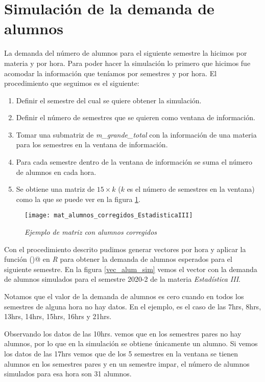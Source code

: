 \section{Simulación de la demanda de alumnos}

La demanda del número de alumnos para el siguiente semestre la hicimos por materia y por hora. Para poder hacer la simulación lo primero que hicimos fue acomodar la información que teníamos por semestres y por hora. El procedimiento que seguimos es el siguiente:

\begin{enumerate}
\item Definir el semestre del cual se quiere obtener la simulación.

\item Definir el número de semestres que se quieren como ventana de información.

\item Tomar una submatriz de \textit{m\_grande\_total} con la información de una materia para los semestres en la ventana de información.

\item Para cada semestre dentro de la ventana de información se suma el número de alumnos en cada hora.

\item Se obtiene una matriz de $15 \times k$ ($k$ es el número de semestres en la ventana) como la que se puede ver en la figura \ref{matAl_corregidos}.
\end{enumerate}

\begin{figure}[H]
\centering
\texttt{[image: mat\_alumnos\_corregidos\_EstadisticaIII]} %
\caption{\textit{Ejemplo de matriz con alumnos corregidos}}\label{matAl_corregidos}
\end{figure}

Con el procedimiento descrito pudimos generar vectores por hora y aplicar la función \verb@hw()@ en \textit{R} para obtener la demanda de alumnos esperados para el siguiente semestre. En la figura \ref{vec_alum_sim} vemos el vector con la demanda de alumnos simulados para el semestre 2020-2 de la materia \textit{Estadística III}.

Notamos que el valor de la demanda de alumnos es cero cuando en todos los semestres de alguna hora no hay datos. En el ejemplo, es el caso de las 7hrs, 8hrs, 13hrs, 14hrs, 15hrs, 16hrs y 21hrs.

Observando los datos de las 10hrs. vemos que en los semestres pares no hay alumnos, por lo que en la simulación se obtiene únicamente un alumno. Si vemos los datos de las 17hrs vemos que de los 5 semestres en la ventana se tienen alumnos en los semestres pares y en un semestre impar, el número de alumnos simulados para esa hora son 31 alumnos.

